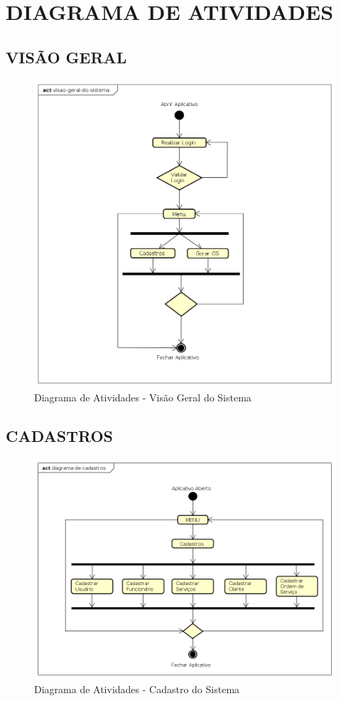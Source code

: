 \section{DIAGRAMA DE ATIVIDADES}
\subsection{VISÃO GERAL}
\begin{figure}[htb]
	\caption{\label{fig_visao-geral} Diagrama de Atividades - Visão Geral do Sistema}
	\begin{center}
	    \includegraphics[width=0.75\linewidth]{imagens/diagrama-atividade-visao-geral.png}
	\end{center}
\end{figure}

\newpage

\subsection{CADASTROS}
\begin{figure}[htb]
	\caption{\label{fig_cadastro} Diagrama de Atividades - Cadastro do Sistema}
	\begin{center}
	    \includegraphics[width=0.9\linewidth]{imagens/diagrama-de-cadastros.png}
	\end{center}
\end{figure}

